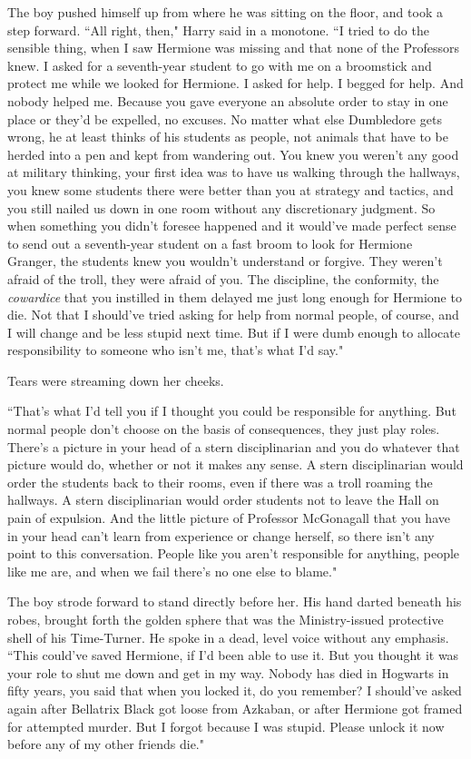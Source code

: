 The boy pushed himself up from where he was sitting on the floor, and took a step forward. ``All right, then," Harry said in a monotone. ``I tried to do the sensible thing, when I saw Hermione was missing and that none of the Professors knew. I asked for a seventh-year student to go with me on a broomstick and protect me while we looked for Hermione. I asked for help. I begged for help. And nobody helped me. Because you gave everyone an absolute order to stay in one place or they'd be expelled, no excuses. No matter what else Dumbledore gets wrong, he at least thinks of his students as people, not animals that have to be herded into a pen and kept from wandering out. You knew you weren't any good at military thinking, your first idea was to have us walking through the hallways, you knew some students there were better than you at strategy and tactics, and you still nailed us down in one room without any discretionary judgment. So when something you didn't foresee happened and it would've made perfect sense to send out a seventh-year student on a fast broom to look for Hermione Granger, the students knew you wouldn't understand or forgive. They weren't afraid of the troll, they were afraid of you. The discipline, the conformity, the \emph{cowardice} that you instilled in them delayed me just long enough for Hermione to die. Not that I should've tried asking for help from normal people, of course, and I will change and be less stupid next time. But if I were dumb enough to allocate responsibility to someone who isn't me, that's what I'd say."

Tears were streaming down her cheeks.

``That's what I'd tell you if I thought you could be responsible for anything. But normal people don't choose on the basis of consequences, they just play roles. There's a picture in your head of a stern disciplinarian and you do whatever that picture would do, whether or not it makes any sense. A stern disciplinarian would order the students back to their rooms, even if there was a troll roaming the hallways. A stern disciplinarian would order students not to leave the Hall on pain of expulsion. And the little picture of Professor McGonagall that you have in your head can't learn from experience or change herself, so there isn't any point to this conversation. People like you aren't responsible for anything, people like me are, and when we fail there's no one else to blame."

The boy strode forward to stand directly before her. His hand darted beneath his robes, brought forth the golden sphere that was the Ministry-issued protective shell of his Time-Turner. He spoke in a dead, level voice without any emphasis. ``This could've saved Hermione, if I'd been able to use it. But you thought it was your role to shut me down and get in my way. Nobody has died in Hogwarts in fifty years, you said that when you locked it, do you remember? I should've asked again after Bellatrix Black got loose from Azkaban, or after Hermione got framed for attempted murder. But I forgot because I was stupid. Please unlock it now before any of my other friends die."

